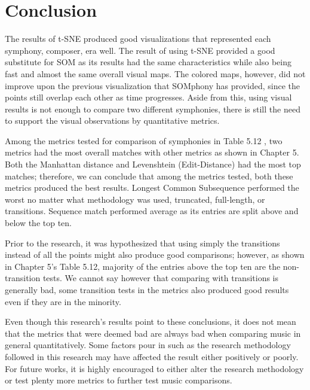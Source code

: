 \chapter{Conclusion}
The results of t-SNE produced good visualizations that represented each symphony, composer, era well. The result of using t-SNE provided a good substitute for SOM as its results had the same characteristics while also being fast and almost the same overall visual maps. The colored maps, however, did not improve upon the previous visualization that SOMphony has provided, since the points still overlap each other as time progresses. Aside from this, using visual results is not enough to compare two different symphonies, there is still the need to support the visual observations by quantitative metrics. 

Among the metrics tested for comparison of symphonies in Table 5.12 , two metrics had the most overall matches with other metrics as shown in Chapter 5. Both the Manhattan distance and Levenshtein (Edit-Distance) had the most top matches; therefore, we can conclude that among the metrics tested, both these metrics produced the best results. Longest Common Subsequence performed the worst no matter what methodology was used, truncated, full-length, or transitions. Sequence match performed average as its entries are split above and below the top ten.

Prior to the research, it was hypothesized that using simply the transitions instead of all the points might also produce good comparisons; however, as shown in Chapter 5’s Table 5.12, majority of the entries above the top ten are the non-transition tests. We cannot say however that comparing with transitions is generally bad, some transition tests in the metrics also produced good results even if they are in the minority.

Even though this research’s results point to these conclusions, it does not mean that the metrics that were deemed bad are always bad when comparing music in general quantitatively. Some  factors pour in such as the research methodology followed in this research may have affected the result either positively or poorly. For future works, it is highly encouraged to either alter the research methodology or test plenty more metrics to further test music comparisons.

\nocite{*}